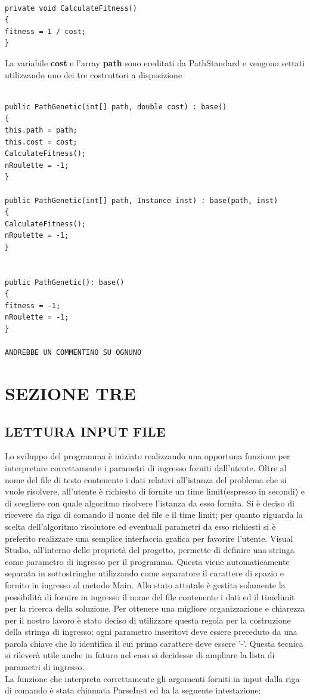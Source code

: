 \documentclass[11pt]{article}
\begin{document}
\begin{lstlisting}

private void CalculateFitness()
{
fitness = 1 / cost;
}

\end{lstlisting}

La variabile \textbf{cost} e l’array \textbf{path} sono ereditati da PathStandard e vengono settati utilizzando uno dei tre costruttori a disposizione

\begin{lstlisting}

public PathGenetic(int[] path, double cost) : base()
{
this.path = path;
this.cost = cost;
CalculateFitness();
nRoulette = -1;
}

public PathGenetic(int[] path, Instance inst) : base(path, inst)
{
CalculateFitness();
nRoulette = -1;
}


public PathGenetic(): base()
{
fitness = -1;
nRoulette = -1;
}

ANDREBBE UN COMMENTINO SU OGNUNO

\end{lstlisting}

\section*{SEZIONE TRE}

\subsection*{LETTURA INPUT FILE}

Lo sviluppo del programma è iniziato realizzando una opportuna funzione per interpretare correttamente i parametri di ingresso forniti dall'utente. Oltre al nome del file di testo contenente i dati relativi  all'istanza del problema che si vuole risolvere, all'utente è richiesto di fornite un time limit(espresso in secondi) e di scegliere con quale algoritmo risolvere l'istanza da esso fornita. Si è deciso di ricevere da riga di comando il nome del file e il time limit; per quanto riguarda la scelta dell'algoritmo risolutore ed eventuali parametri da esso richiesti si è preferito realizzare una semplice interfaccia grafica per favorire l'utente. 
Visual Studio, all'interno delle proprietà del progetto, permette di definire una stringa come parametro di ingresso per il programma. Questa viene automaticamente separata in sottostringhe utilizzando come separatore il carattere di spazio e fornito in ingresso al metodo Main. Allo stato attutale è gestita solamente la possibilità di fornire in ingresso il nome del file contenente i dati ed il timelimit per la ricerca della soluzione. Per ottenere una migliore organizzazione e chiarezza per il nostro lavoro è stato deciso di utilizzare questa regola per la costruzione della stringa di ingresso: ogni parametro inseritovi deve essere preceduto da una parola chiave che lo identifica il cui primo carattere deve essere '-'. Questa tecnica si rileverà utile anche in futuro nel caso si decidesse di ampliare la lista di parametri di ingresso.\\
La funzione che interpreta correttamente gli argomenti forniti in input dalla riga di comando è stata chiamata ParseInst ed ha la seguente intestazione:
\end{document}
